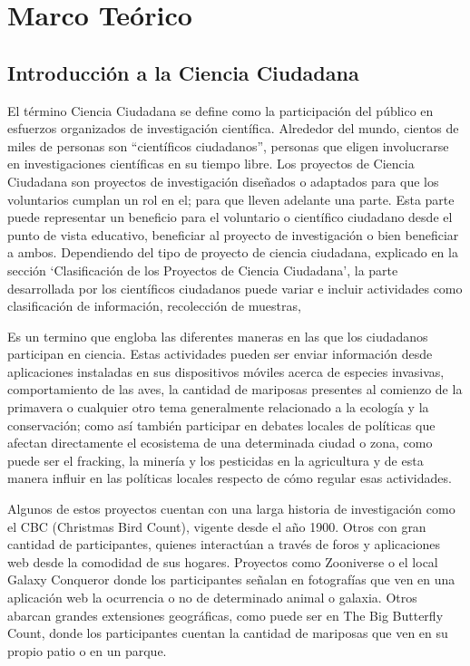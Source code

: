 \chapter{Marco Teórico}
		
	
\section{Introducción a la Ciencia Ciudadana}
    
    El término Ciencia Ciudadana se define como la participación del público en esfuerzos organizados de investigación científica. Alrededor del mundo, cientos de miles de personas son ``científicos ciudadanos'', personas que eligen involucrarse en investigaciones científicas en su tiempo libre. \cite{louv2012citizen} Los proyectos de Ciencia Ciudadana son proyectos de investigación diseñados o adaptados para que los voluntarios cumplan un rol en el; para que lleven adelante una parte. Esta parte puede representar un beneficio para el voluntario o científico ciudadano desde el punto de vista educativo, beneficiar al proyecto de investigación o bien beneficiar a ambos.\cite{silvertown2009new} Dependiendo del tipo de proyecto de ciencia ciudadana, explicado en la sección `Clasificación de los Proyectos de Ciencia Ciudadana', la parte desarrollada por los científicos ciudadanos puede variar e incluir actividades como clasificación de información, recolección de muestras, 
    
    Es un termino que engloba las diferentes maneras en las que los ciudadanos participan en ciencia. Estas actividades pueden ser enviar información desde aplicaciones instaladas en sus dispositivos móviles acerca de especies invasivas, comportamiento de las aves, la cantidad de mariposas presentes al comienzo de la primavera o cualquier otro tema generalmente relacionado a la ecología y la conservación; como así también participar en debates locales de políticas que afectan directamente el ecosistema de una determinada ciudad o zona, como puede ser el fracking, la minería y los pesticidas en la agricultura y de esta manera influir en las políticas locales respecto de cómo regular esas actividades.\cite{envCitizenScience}
    
	Algunos de estos proyectos cuentan con una larga historia de investigación como el CBC (Christmas Bird Count), vigente desde el año 1900. Otros con gran cantidad de participantes, quienes interactúan a través de foros y aplicaciones web desde la comodidad de sus hogares. Proyectos como Zooniverse o el local Galaxy Conqueror donde los participantes señalan en fotografías que ven en una aplicación web la ocurrencia o no de determinado animal o galaxia. Otros abarcan grandes extensiones geográficas, como puede ser en The Big Butterfly Count, donde los participantes cuentan la cantidad de mariposas que ven en su propio patio o en un parque. \cite{shirk2012public} 
		
